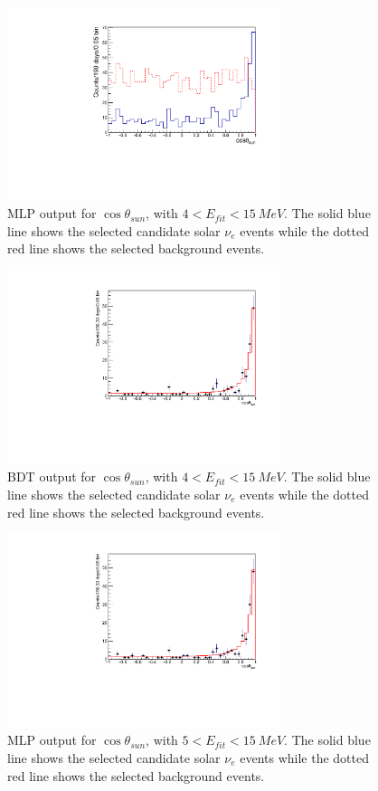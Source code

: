 \begin{figure}[!htb]
	\centering
	\includegraphics[width=8cm]{cosThetaToSun_4to15_MLP.pdf}
	\caption{MLP output for $\cos\theta_{sun}$, with $4<E_{fit}<15~MeV$. The solid blue line shows the selected candidate solar $\nu_e$ events while the dotted red line shows the selected background events.}
	\label{cosThetaToSun_4to15_MLP}
\end{figure}

\begin{figure}[!htb]
	\centering
	\includegraphics[width=8cm]{cosThetaToSun_5to15_BDT.pdf}
	\caption{BDT output for $\cos\theta_{sun}$, with $4<E_{fit}<15~MeV$. The solid blue line shows the selected candidate solar $\nu_e$ events while the dotted red line shows the selected background events.}
	\label{cosThetaToSun_5to15_BDT}
\end{figure}

\begin{figure}[!htb]
	\centering
	\includegraphics[width=8cm]{cosThetaToSun_5to15_MLP.pdf}
	\caption{MLP output for $\cos\theta_{sun}$, with $5<E_{fit}<15~MeV$. The solid blue line shows the selected candidate solar $\nu_e$ events while the dotted red line shows the selected background events.}
	\label{cosThetaToSun_5to15_MLP}
\end{figure}


